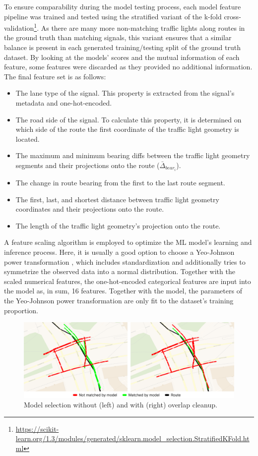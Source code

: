 To ensure comparability during the model testing process, each model feature pipeline was trained and tested using the stratified variant of the k-fold cross-validation\footnote{\url{https://scikit-learn.org/1.3/modules/generated/sklearn.model_selection.StratifiedKFold.html}}. As there are many more non-matching traffic lights along routes in the ground truth than matching signals, this variant ensures that a similar balance is present in each generated training/testing split of the ground truth dataset. By looking at the models' scores and the mutual information of each feature, some features were discarded as they provided no additional information. The final feature set is as follows:

\begin{itemize}
    \item The lane type of the signal. This property is extracted from the signal's metadata and one-hot-encoded.
    \item The road side of the signal. To calculate this property, it is determined on which side of the route the first coordinate of the traffic light geometry is located.
    \item The maximum and minimum bearing diffs between the traffic light geometry segments and their projections onto the route ($\bar{\Delta}_{bear_i}$).
    \item The change in route bearing from the first to the last route segment. 
    \item The first, last, and shortest distance between traffic light geometry coordinates and their projections onto the route.
    \item The length of the traffic light geometry's projection onto the route.
\end{itemize}

A feature scaling algorithm is employed to optimize the ML model's learning and inference process. Here, it is usually a good option to choose a Yeo-Johnson power transformation \cite{yeo_new_2000}, which includes standardization and additionally tries to symmetrize the observed data into a normal distribution. Together with the scaled numerical features, the one-hot-encoded categorical features are input into the model as, in sum, 16 features. Together with the model, the parameters of the Yeo-Johnson power transformation are only fit to the dataset's training proportion.

\begin{figure}[htbp]
\centering
\includegraphics[width=\linewidth]{images/sg-selection-overlap-cleanup.png}
\caption{Model selection without (left) and with (right) overlap cleanup.}
\label{fig:sg-selection-overlap-cleanup}
\end{figure}

